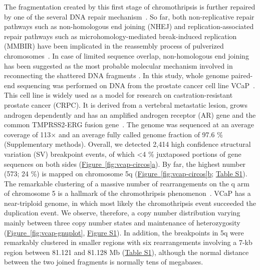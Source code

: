 The fragmentation created by this first stage of chromothripsis is further repaired by one of the several DNA repair mechanism~\cite{holland2012chromoanagenesis}.
So far, both non-replicative repair pathways such as non-homologous end joining (NHEJ) and replication-associated repair pathways such as microhomology-mediated
break-induced replication (MMBIR) have been implicated in the reassembly process of pulverized chromosomes~\cite{forment2012chromothripsis}. In case of limited sequence
overlap, non-homologous end joining has been suggested as the most probable molecular mechanism involved in reconnecting the shattered DNA fragments
\cite{rausch2012genome}.
In this study, whole genome paired-end sequencing was performed on DNA from the prostate cancer cell line VCaP~\cite{drmanac2010human}. This cell line is widely
used as a model for research on castration-resistant prostate cancer (CRPC). It is derived from a vertebral metastatic lesion, grows androgen dependently and
has an amplified androgen receptor (AR) gene and the common TMPRSS2-ERG fusion gene~\cite{korenchuk2001vcap}. The genome was sequenced at an average coverage
of 113× and an average fully called genome fraction of 97.6 \% (Supplementary methods). Overall, we detected 2,414 high confidence structural variation (SV)
breakpoint events, of which <4 \% juxtaposed portions of gene sequences on both sides (\hyperref[fig:vcap-circos]{Figure~\ref*{fig:vcap-circos}a}). By far, the highest number (573; 24 \%) is
 mapped on chromosome 5q (\hyperref[fig:vcap-circos]{Figure~\ref*{fig:vcap-circos}b}; \href{https://link.springer.com/article/10.1007/s00439-013-1308-1#SupplementaryMaterial}{Table S1}). The remarkable clustering of a massive number of rearrangements on the q arm of chromosome 5 is
a hallmark of the chromothripsis phenomenon~\cite{forment2012chromothripsis}. VCaP has a near-triploid genome, in which most likely the chromothripsis event succeeded
the duplication event. We observe, therefore, a copy number distribution varying mainly between three copy number states and maintenance of heterozygosity
(\hyperref[vcap-gnuplot]{Figure~\ref*{fig:vcap-gnuplot}}, \href{https://link.springer.com/article/10.1007/s00439-013-1308-1#SupplementaryMaterial}{Figure S1}). In addition, the breakpoints in 5q were remarkably clustered in smaller regions with six rearrangements involving a 7-kb
region between 81.121 and 81.128 Mb (\href{https://link.springer.com/article/10.1007/s00439-013-1308-1#SupplementaryMaterial}{Table S1}), although the normal distance between the two joined fragments is normally tens of megabases.

